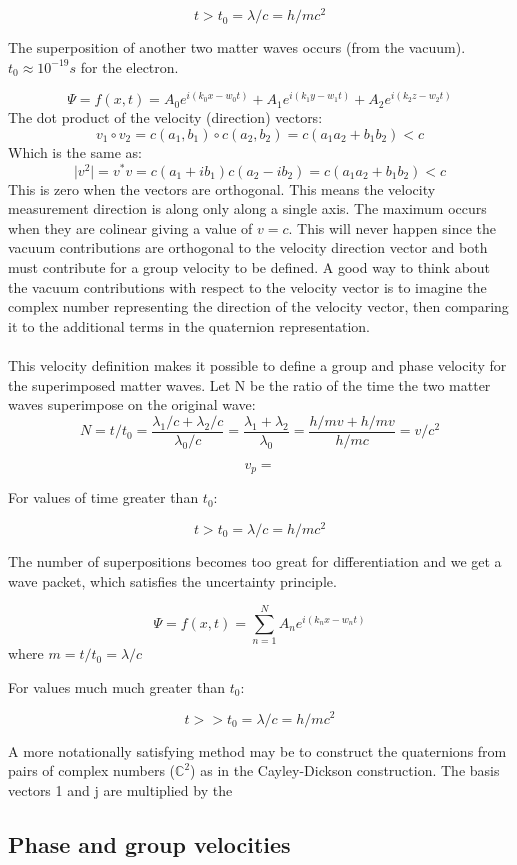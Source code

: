 \documentclass{article}
\begin{document}
$$t>t_0=\lambda /c=h/mc^2$$

The superposition of another two matter waves occurs (from the vacuum). $t_0 \approx 10^{-19}s$ for the electron.

$$\Psi=f(x,t)=A_0 e^{i(k_0 x-w_0 t)}+A_1e^{i(k_1 y-w_1 t)}+A_2e^{i(k_2 z-w_2 t)}$$
The dot product of the velocity (direction) vectors:
$$v_1 \circ v_2=c(a_1, b_1)\circ c(a_2, b_2)=c(a_1 a_2 + b_1 b_2)<c$$
Which is the same as:
$$\lvert v^2 \rvert =v^*v=c(a_1+ib_1)c(a_2-ib_2)=c(a_1 a_2+b_1 b_2)<c$$
This is zero when the vectors are orthogonal. This means the velocity measurement direction is along only along a single axis. The maximum occurs when they are colinear giving a value of $v=c$. This will never happen since the vacuum contributions are orthogonal to the velocity direction vector and both must contribute for a group velocity to be defined. A good way to think about the vacuum contributions with respect to the velocity vector is to imagine the complex number representing the direction of the velocity vector, then comparing it to the additional terms in the quaternion representation.\\
\\
This velocity definition makes it possible to define a group and phase velocity for the superimposed matter waves. Let N be the ratio of the time the two matter waves superimpose on the original wave:
$$N=t/t_0=\frac{\lambda_1/c+\lambda_2/c}{\lambda_0/c}=\frac{\lambda_1+\lambda_2}{\lambda_0}=\frac{h/mv+h/mv}{h/mc}=v/c^2$$

$$v_p=$$

For values of time greater than $t_0$:

$$t>t_0=\lambda /c=h/mc^2$$

The number of superpositions becomes too great for differentiation and we get a wave packet, which satisfies the uncertainty principle.

$$\Psi=f(x,t)=\sum_{n=1}^N{A_n e^{i(k_n x-w_n t)}}$$ 
where $m=t/t_0=\lambda /c $

For values much much greater than $t_0$:

$$t>>t_0=\lambda /c=h/mc^2$$


A more notationally satisfying method may be to construct the quaternions from pairs of complex numbers ($\mathbb{C}^2$) as in the Cayley-Dickson construction. The basis vectors 1 and j are multiplied by the 

\subsection{Phase and group velocities}
\end{document}
